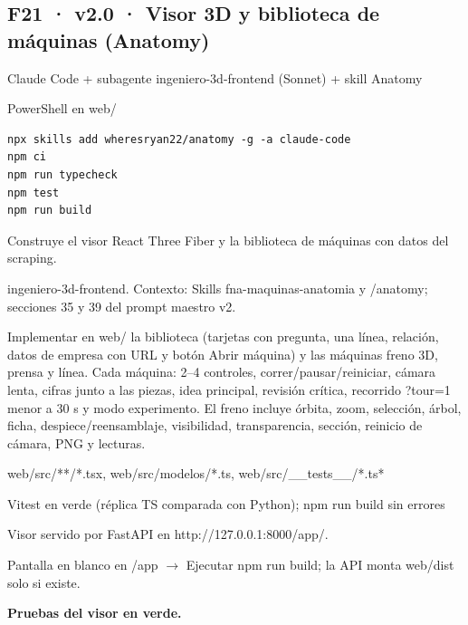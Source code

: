 \subsection{F21 · v2.0 · Visor 3D y biblioteca de máquinas (Anatomy)}\label{fase:F21}
\begin{description}[leftmargin=3.2cm,style=nextline]
\item[1. Herramienta] Claude Code + subagente ingeniero-3d-frontend (Sonnet) + skill Anatomy
\item[2. Terminal] PowerShell en web/
\item[3. Comandos] \leavevmode
\begin{lstlisting}[style=ps]
npx skills add wheresryan22/anatomy -g -a claude-code
npm ci
npm run typecheck
npm test
npm run build
\end{lstlisting}
\item[4. Explicación] Construye el visor React Three Fiber y la biblioteca de máquinas con datos del scraping.
\item[5. Agente] ingeniero-3d-frontend. Contexto: Skills fna-maquinas-anatomia y /anatomy; secciones 35 y 39 del prompt maestro v2.
\begin{promptbox}Implementar en web/ la biblioteca (tarjetas con pregunta, una línea, relación, datos de empresa con URL y botón Abrir máquina) y las máquinas freno 3D, prensa y línea. Cada máquina: 2–4 controles, correr/pausar/reiniciar, cámara lenta, cifras junto a las piezas, idea principal, revisión crítica, recorrido ?tour=1 menor a 30 s y modo experimento. El freno incluye órbita, zoom, selección, árbol, ficha, despiece/reensamblaje, visibilidad, transparencia, sección, reinicio de cámara, PNG y lecturas.\end{promptbox}
\item[6. Archivos] web/src/**/*.tsx, web/src/modelos/*.ts, web/src/\_\_tests\_\_/*.ts*
\item[7. Pruebas] Vitest en verde (réplica TS comparada con Python); npm run build sin errores
\item[8. Resultado] Visor servido por FastAPI en http://127.0.0.1:8000/app/.
\item[9. Errores] Pantalla en blanco en /app $\rightarrow$ Ejecutar npm run build; la API monta web/dist solo si existe.
\item[10. Condición] \textbf{Pruebas del visor en verde.}
\end{description}

